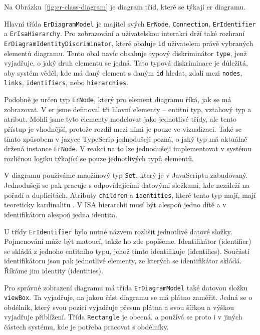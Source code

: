 Na Obrázku~\ref{fig:er-class-diagram} je diagram tříd, které se týkají \acrshort{er} diagramu.

Hlavní třída \texttt{ErDiagramModel} je majitel svých \texttt{ErNode}, \texttt{Connection}, \texttt{ErIdentifier} a \texttt{ErIsaHierarchy}.
Pro zobrazování a uživatelskou interakci drží také rozhraní \texttt{ErDiagramIdentityDiscriminator}, které obaluje \texttt{id} uživatelem právě vybraných elementů diagramu.
Tento obal navíc obsahuje typový diskriminátor \texttt{type}, jenž vyjadřuje, o jaký druh elementu se jedná.
Tato typová diskriminace je důležitá, aby systém věděl, kde má daný element s daným \texttt{id} hledat, zdali mezi \texttt{nodes}, \texttt{links}, \texttt{identifiers}, nebo \texttt{hierarchies}.

Podobně je určen typ \texttt{ErNode}, který pro element diagramu říká, jak se má zobrazovat.
V \acrshort{er} jsme definoval tři hlavní elementy -- entitní typ, vztahový typ a atribut.
Mohli jsme tyto elementy modelovat jako jednotlivé třídy, ale tento přístup je vhodnější, protože rozdíl mezi nimi je pouze ve vizualizaci.
Také se tímto způsobem v jazyce TypeScrip jednodušeji pozná, o jaký typ má aktuálně držená instance \texttt{ErNode}.
V reakci na to lze jednodušeji implementovat v systému rozličnou logiku týkající se pouze jednotlivých typů elementů.

V diagramu používáme množinový typ \texttt{Set}, který je v JavaScriptu zabudovaný.
Jednodušeji se pak pracuje s odpovídajícími datovými složkami, kde nezáleží na pořadí a duplicitách.
Atributy \texttt{children} a \texttt{identities}, které tento typ mají, mají teoreticky kardinalitu \onemany{}.
V ISA hierarchii musí být alespoň jedno dítě a v identifikátoru alespoň jedna identita.

U třídy \texttt{ErIdentifier} bylo nutné názvem rozlišit jednotlivé datové složky.
Pojmenování může být matoucí, takže ho zde popíšeme.
Identifikátor (identifier) se skládá z jednoho entitního typu, jehož tímto identifikuje (identifies).
Součástí identifikátoru jsou pak jednotlivé elementy, ze kterých se identifikátor skládá.
Říkáme jim identity (identities).

Pro správné zobrazení diagramu má třída \texttt{ErDiagramModel} také datovou složku \texttt{viewBox}.
Ta vyjadřuje, na jakou část diagramu se má plátno zaměřit.
Jedná se o obdélník, který svou pozicí vyjadřuje přesun plátna a svou šířkou a výškou vyjadřuje přiblížení.
Třída \texttt{Rectangle} je obecná, a používá se proto i v jiných částech systému, kde je potřeba pracovat s obdélníky.


